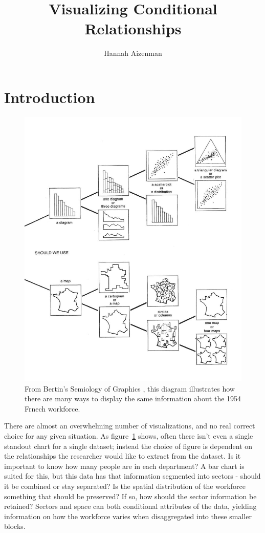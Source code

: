 \documentclass[letterpaper,onecolumn,titlepage]{Ythesis}
\title{Visualizing Conditional Relationships}
\author{Hannah Aizenman}
\begin{document}
\makefrontmatter

\section{Introduction}
\label{sec:introduction}
\begin{figure}
  \includegraphics{chart_chooser.png}
  \caption{From Bertin's Semiology of Graphics \cite{bertin_semiology_2011}, this diagram
    illustrates how there are many ways to display the same information about the 1954 Frnech
  workforce.}
  \label{fig:chart_chooser}
\end{figure}

There are almost an overwhelming number of visualizations, and no real correct
choice for any given situation. As figure~\ref{fig:chart_chooser} shows, often
there isn't even a single standout chart for a single dataset; instead the
choice of figure is dependent on the relationships the researcher would like to
extract from the dataset. Is it important to know how many people are in each
department? A bar chart is suited for this, but this data has that information
segmented into sectors - should it be combined or stay separated? Is the
spatial distribution of the workforce something that should be preserved? If
so, how should the sector information be retained? Sectors and space can both
conditional attributes of the data, yielding information on how the workforce
varies when disaggregated into these smaller blocks.
\end{document}
